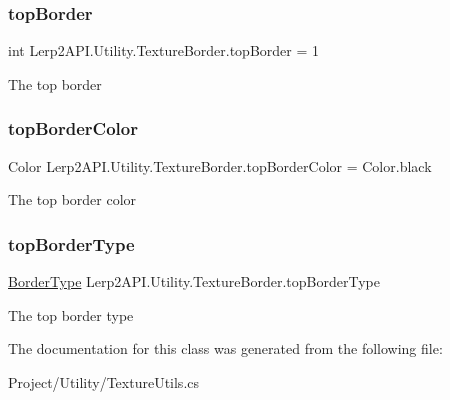 \subsubsection{\texorpdfstring{top\+Border}{topBorder}}
{\footnotesize\ttfamily int Lerp2\+A\+P\+I.\+Utility.\+Texture\+Border.\+top\+Border = 1}



The top border 

\mbox{\label{class_lerp2_a_p_i_1_1_utility_1_1_texture_border_aac01e793a9aefafa7b3eb7cc8d2b7398}} 
\subsubsection{\texorpdfstring{top\+Border\+Color}{topBorderColor}}
{\footnotesize\ttfamily Color Lerp2\+A\+P\+I.\+Utility.\+Texture\+Border.\+top\+Border\+Color = Color.\+black}



The top border color 

\mbox{\label{class_lerp2_a_p_i_1_1_utility_1_1_texture_border_a08229d19679369eb15ba1e6ccbca7e89}} 
\subsubsection{\texorpdfstring{top\+Border\+Type}{topBorderType}}
{\footnotesize\ttfamily \hyperlink{namespace_lerp2_a_p_i_1_1_utility_a8046e09472382edc5b740291a380c94c}{Border\+Type} Lerp2\+A\+P\+I.\+Utility.\+Texture\+Border.\+top\+Border\+Type}



The top border type 



The documentation for this class was generated from the following file\+:\begin{DoxyCompactItemize}
\item 
Project/\+Utility/Texture\+Utils.\+cs\end{DoxyCompactItemize}
